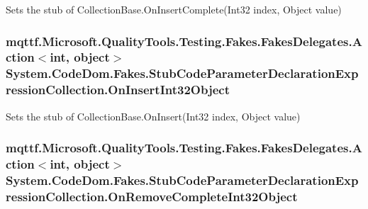 Sets the stub of Collection\-Base.\-On\-Insert\-Complete(\-Int32 index, Object value)

\hypertarget{class_system_1_1_code_dom_1_1_fakes_1_1_stub_code_parameter_declaration_expression_collection_a7a349df319e3b7bcc1726a9e0730c017}{
\subsubsection[{On\-Insert\-Int32\-Object}]{\setlength{\rightskip}{0pt plus 5cm}mqttf.\-Microsoft.\-Quality\-Tools.\-Testing.\-Fakes.\-Fakes\-Delegates.\-Action$<$int, object$>$ System.\-Code\-Dom.\-Fakes.\-Stub\-Code\-Parameter\-Declaration\-Expression\-Collection.\-On\-Insert\-Int32\-Object}}\label{class_system_1_1_code_dom_1_1_fakes_1_1_stub_code_parameter_declaration_expression_collection_a7a349df319e3b7bcc1726a9e0730c017}


Sets the stub of Collection\-Base.\-On\-Insert(\-Int32 index, Object value)

\hypertarget{class_system_1_1_code_dom_1_1_fakes_1_1_stub_code_parameter_declaration_expression_collection_a288dad00bf9241db67005582d91a2c50}{
\subsubsection[{On\-Remove\-Complete\-Int32\-Object}]{\setlength{\rightskip}{0pt plus 5cm}mqttf.\-Microsoft.\-Quality\-Tools.\-Testing.\-Fakes.\-Fakes\-Delegates.\-Action$<$int, object$>$ System.\-Code\-Dom.\-Fakes.\-Stub\-Code\-Parameter\-Declaration\-Expression\-Collection.\-On\-Remove\-Complete\-Int32\-Object}}\label{class_system_1_1_code_dom_1_1_fakes_1_1_stub_code_parameter_declaration_expression_collection_a288dad00bf9241db67005582d91a2c50}


